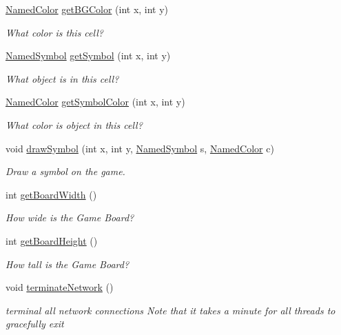 \begin{DoxyCompactItemize}
\mbox{\hyperlink{enumbridges_1_1base_1_1_named_color}{Named\+Color}} \mbox{\hyperlink{classbridges_1_1games_1_1_game_base_a516920ad24fefd3118757f0c631b774f}{get\+B\+G\+Color}} (int x, int y)
\begin{DoxyCompactList}\small\item\em What color is this cell? \end{DoxyCompactList}\item 
\mbox{\hyperlink{enumbridges_1_1base_1_1_named_symbol}{Named\+Symbol}} \mbox{\hyperlink{classbridges_1_1games_1_1_game_base_ad7c48a1551044b5f2d0357448cdd3124}{get\+Symbol}} (int x, int y)
\begin{DoxyCompactList}\small\item\em What object is in this cell? \end{DoxyCompactList}\item 
\mbox{\hyperlink{enumbridges_1_1base_1_1_named_color}{Named\+Color}} \mbox{\hyperlink{classbridges_1_1games_1_1_game_base_a07d351db46d88b49471baa68eed23e54}{get\+Symbol\+Color}} (int x, int y)
\begin{DoxyCompactList}\small\item\em What color is object in this cell? \end{DoxyCompactList}\item 
void \mbox{\hyperlink{classbridges_1_1games_1_1_game_base_a7dd4caecd0522dcf7fc275517fbc695d}{draw\+Symbol}} (int x, int y, \mbox{\hyperlink{enumbridges_1_1base_1_1_named_symbol}{Named\+Symbol}} s, \mbox{\hyperlink{enumbridges_1_1base_1_1_named_color}{Named\+Color}} c)
\begin{DoxyCompactList}\small\item\em Draw a symbol on the game. \end{DoxyCompactList}\item 
int \mbox{\hyperlink{classbridges_1_1games_1_1_game_base_a33018840a6f19eb54ef27e55231871f5}{get\+Board\+Width}} ()
\begin{DoxyCompactList}\small\item\em How wide is the Game Board? \end{DoxyCompactList}\item 
int \mbox{\hyperlink{classbridges_1_1games_1_1_game_base_a1effb2a789eb19eb81dec64f25be233e}{get\+Board\+Height}} ()
\begin{DoxyCompactList}\small\item\em How tall is the Game Board? \end{DoxyCompactList}\item 
void \mbox{\hyperlink{classbridges_1_1games_1_1_game_base_a3b0898cf9a8348245cd16382d670b486}{terminate\+Network}} ()
\begin{DoxyCompactList}\small\item\em terminal all network connections Note that it takes a minute for all threads to gracefully exit \end{DoxyCompactList}\end{DoxyCompactItemize}
